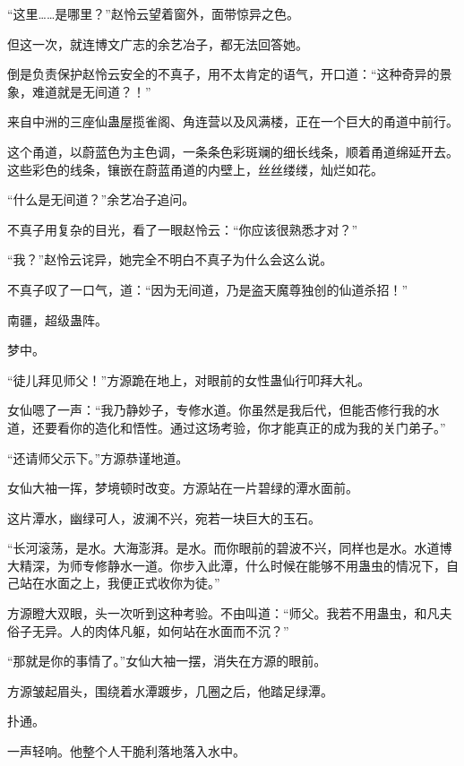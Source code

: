 
\begin{this_body}



“这里……是哪里？”赵怜云望着窗外，面带惊异之色。

但这一次，就连博文广志的余艺冶子，都无法回答她。

倒是负责保护赵怜云安全的不真子，用不太肯定的语气，开口道：“这种奇异的景象，难道就是无间道？！”

来自中洲的三座仙蛊屋揽雀阁、角连营以及风满楼，正在一个巨大的甬道中前行。

这个甬道，以蔚蓝色为主色调，一条条色彩斑斓的细长线条，顺着甬道绵延开去。这些彩色的线条，镶嵌在蔚蓝甬道的内壁上，丝丝缕缕，灿烂如花。

“什么是无间道？”余艺冶子追问。

不真子用复杂的目光，看了一眼赵怜云：“你应该很熟悉才对？”

“我？”赵怜云诧异，她完全不明白不真子为什么会这么说。

不真子叹了一口气，道：“因为无间道，乃是盗天魔尊独创的仙道杀招！”

南疆，超级蛊阵。

梦中。

“徒儿拜见师父！”方源跪在地上，对眼前的女性蛊仙行叩拜大礼。

女仙嗯了一声：“我乃静妙子，专修水道。你虽然是我后代，但能否修行我的水道，还要看你的造化和悟性。通过这场考验，你才能真正的成为我的关门弟子。”

“还请师父示下。”方源恭谨地道。

女仙大袖一挥，梦境顿时改变。方源站在一片碧绿的潭水面前。

这片潭水，幽绿可人，波澜不兴，宛若一块巨大的玉石。

“长河滚荡，是水。大海澎湃。是水。而你眼前的碧波不兴，同样也是水。水道博大精深，为师专修静水一道。你步入此潭，什么时候在能够不用蛊虫的情况下，自己站在水面之上，我便正式收你为徒。”

方源瞪大双眼，头一次听到这种考验。不由叫道：“师父。我若不用蛊虫，和凡夫俗子无异。人的肉体凡躯，如何站在水面而不沉？”

“那就是你的事情了。”女仙大袖一摆，消失在方源的眼前。

方源皱起眉头，围绕着水潭踱步，几圈之后，他踏足绿潭。

扑通。

一声轻响。他整个人干脆利落地落入水中。


\end{this_body}
